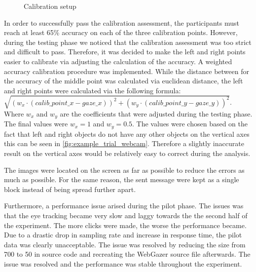 \begin{figure}
    \centering
    \caption{Calibration setup}
    \label{fig:calibration_webcam}
\end{figure}

In order to successfully pass the calibration assessment, the participants must reach at least 65\% accuracy on each of the three calibration points. However, during the testing phase we noticed that the calibration assessment was too strict and difficult to pass. Therefore, it was decided to make the left and right points easier to calibrate via adjusting the calculation of the accuracy. A weighted accuracy calibration procedure was implemented. While the distance between for the accuracy of the middle point was calculated via euclidean distance, the left and right points were calculated via the following formula: $\sqrt{(w_x\cdot(calib\_point\_x - gaze\_x))^2 + (w_y\cdot(calib\_point\_y - gaze\_y))^2}$. Where $w_x$ and $w_y$ are the coefficients that were adjusted during the testing phase. The final values were $w_x = 1$ and $w_y = 0.5$. The values were chosen based on the fact that left and right objects do not have any other objects on the vertical axes this can be seen in \autoref{fig:example_trial_webcam}. Therefore a slightly inaccurate result on the vertical axes would be relatively easy to correct during the analysis.

The images were located on the screen as far as possible to reduce the errors as much as possible. For the same reason, the sent message were kept as a single block instead of being spread further apart. 

Furthermore, a performance issue arised during the pilot phase. The issues was that the eye tracking became very slow and laggy towards the the second half of the experiment. The more clicks were made, the worse the performance became. Due to a drastic drop in sampling rate and increase in response time, the pilot data was clearly unacceptable. The issue was resolved by reducing the  size from 700 to 50 in source code and recreating the WebGazer source file afterwards. The issue was resolved and the performance was stable throughout the experiment. 

